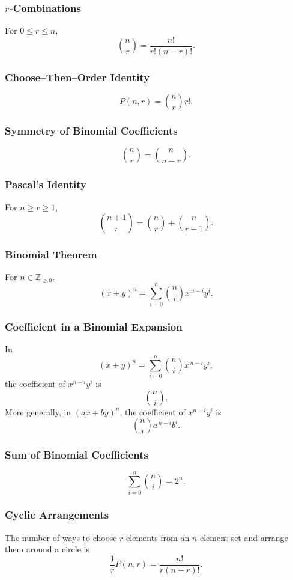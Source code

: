 \documentclass[12pt]{article}
\begin{document}
\subsubsection{\(r\)-Combinations}
For \(0\le r\le n\),
\[
\binom{n}{r}=\frac{n!}{r!(n-r)!}.
\]

\subsubsection{Choose--Then--Order Identity}
\[
P(n,r)=\binom{n}{r}r!.
\]

\subsubsection{Symmetry of Binomial Coefficients}
\[
\binom{n}{r}=\binom{n}{n-r}.
\]

\subsubsection{Pascal's Identity}
For \(n\ge r\ge 1\),
\[
\binom{n+1}{r}=\binom{n}{r}+\binom{n}{r-1}.
\]

\subsubsection{Binomial Theorem}
For \(n\in\mathbb{Z}_{\ge 0}\),
\[
(x+y)^n=\sum_{i=0}^{n}\binom{n}{i}x^{\,n-i}y^i.
\]

\subsubsection{Coefficient in a Binomial Expansion}
In
\[
(x+y)^n=\sum_{i=0}^{n}\binom{n}{i}x^{\,n-i}y^i,
\]
the coefficient of \(x^{n-i}y^i\) is
\[
\binom{n}{i}.
\]
More generally, in \((ax+by)^n\), the coefficient of \(x^{n-i}y^i\) is
\[
\binom{n}{i}a^{\,n-i}b^i.
\]

\subsubsection{Sum of Binomial Coefficients}
\[
\sum_{i=0}^{n}\binom{n}{i}=2^n.
\]

\subsubsection{Cyclic Arrangements}
The number of ways to choose \(r\) elements from an \(n\)-element set and arrange them around a circle is
\[
\frac{1}{r}P(n,r)=\frac{n!}{r(n-r)!}.
\]
\end{document}
